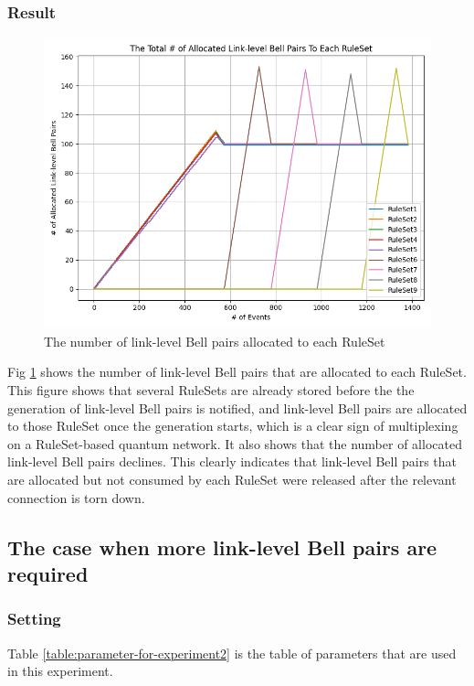 \subsubsection{Result}

\begin{figure}[H]
  \centerline{\includegraphics[width=.6\columnwidth]{images/result1.png}}
  \caption{The number of link-level Bell pairs allocated to each RuleSet}
  \label{fig:result1}
\end{figure}

Fig \ref{fig:result1} shows the number of link-level Bell pairs that are allocated to each RuleSet.
This figure shows that several RuleSets are already stored before the the generation of link-level Bell pairs is notified, and link-level Bell pairs are allocated to those RuleSet once the generation starts, which is a clear sign of multiplexing on a RuleSet-based quantum network.
It also shows that the number of allocated link-level Bell pairs declines.  This clearly indicates that link-level Bell pairs that are allocated but not consumed by each RuleSet were released after the relevant connection is torn down.

\newpage

\subsection{The case when more link-level Bell pairs are required}

\subsubsection{Setting}
Table \ref{table:parameter-for-experiment2} is the table of parameters that are used in this experiment.

